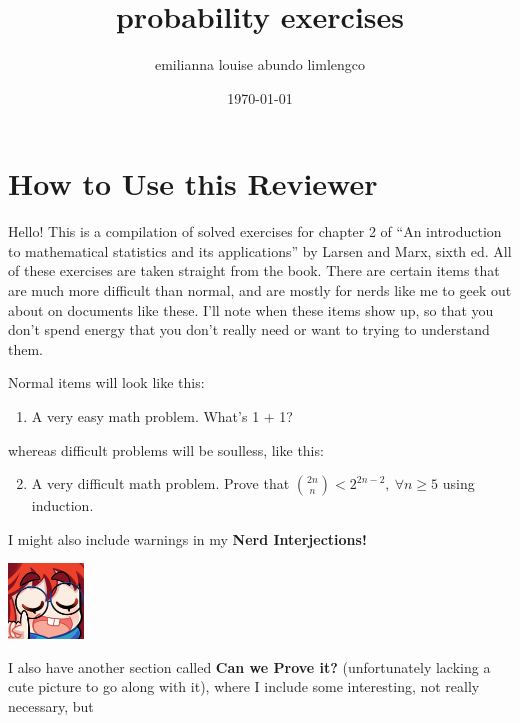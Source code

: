 \documentclass{article}
\title{probability exercises}
\author{emilianna louise abundo limlengco}
\date{\today}
\begin{document}
 

\section*{How to Use this Reviewer}
Hello! This is a compilation of solved exercises for chapter 2 of ``An introduction to mathematical statistics and its applications'' by Larsen and Marx, sixth ed. All of these exercises are taken straight from the book. 
There are certain items that are much more difficult than normal, and are mostly for nerds like me to geek out about 
on documents like these. I'll note when these items show up, so that you don't spend energy that you don't really need or want to trying to understand them.\par Normal items will look like this:\begin{enumerate} 
    \item A very easy math problem. What's 1 + 1?
\end{enumerate} 
whereas difficult problems will be soulless, like this:\begin{enumerate}\setcounter{enumi}{1}
    \renewcommand{\labelenumi}{\fcolorbox{magenta}{white}{\textbf{\arabic{enumi}}}}
    \item A very difficult math problem. Prove that $\displaystyle \binom{2n}{n} < 2^{2n-2},~\forall n \geq 5$ using induction. 
\end{enumerate} I might also include warnings in my \textbf{Nerd Interjections!}\par
\parindent=25pt \begin{minipage}[t]{.14\textwidth}
    \vspace{0pt}
    \includegraphics[width=2cm]{nerd_maddy.png} 
\end{minipage}%
\parindent=0pt \par I also have another section called \textbf{Can we Prove it?} (unfortunately lacking a cute picture to go along with it), where I include some interesting, not really necessary, but 
\end{document}
